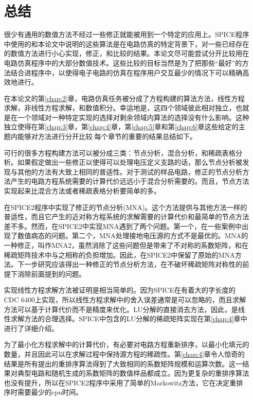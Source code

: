 \chapter{总结}
\label{chap:7}
很少有通用的数值方法不经过一些修正就能被用到一个特定的应用上。SPICE程序中使用的和本论文中说明的这些算法是在电路仿真的特定背景下，对一些已经存在的数值方法进行小心实现，修正，和比较的结果。本论文尽可能尝试分开比较用在电路仿真程序中的大部分数值技术。这些比较的目标当然是为了把那些“最好”的方法结合进程序中，以使得电子电路的仿真在程序用户交互最少的情况下可以精确高效地进行。

在本论文的第\ref{chap:2}章，电路仿真任务被分成了方程构建的算法方法，线性方程求解，非线性方程求解，和数值积分。幸运地是，这四个领域彼此相对独立，也就是在一个领域对一种特定实现的选择对剩余领域内算法的选择没有什么影响。这种独立使得在第\ref{chap:3}章，第\ref{chap:4}章，第\ref{chap:5}章和第\ref{chap:6}章这些给定的主题内能够对方法进行分开比较.每个章节的重要的结果总结如下。

可行的很多方程构建方法可以被分成三类：节点分析，混合分析，和稀疏表格分析。如果假定做出一些修正以使得可以处理电压定义支路的话，那么节点分析被发现与其他的方法有大致上相同的普适性。对于测试的样品电路，修正的节点分析方法产生的电路方程系统需要的计算代价远远小于混合分析需要的。而且，节点方法实现起来比混合方法或者稀疏表格分析要简单的多。

在SPICE2程序中实现了修正的节点分析(MNA)。这个方法提供与其他方法一样的普适性，而且它产生的近对称方程系统的求解需要的计算代价和最简单的节点方法差不多。然而，在SPICE2中实现MNA遇到了两个问题。第一个，在一些案例中出现了数值病态的问题。第二个，MNA处理接地电压源的方式不是最优的。MNA的一种修正，叫作MNA2，虽然消除了这些问题但是带来了不对称的系数矩阵，和在稀疏矩阵技术中与之相称的负担增加。因此，在SPICE2中保留了原始的MNA方法。下一步研究应该得出一种修正的节点分析方法，在不破坏稀疏矩阵对称性的前提下消除前面提到的问题。

实现线性方程求解方法被证明是相当简单的。因为SPICE在有着大的字长度的CDC 6400上实现，所以线性方程求解中的舍入误差通常是可以忽略的，而且求解方法可以基于计算代价而不是精度来优化。LU分解的直接消去方法，因此，是线性求解方法的合理选择。SPICE中包含的LU分解的稀疏矩阵实现在第\ref{chap:4}章中进行了详细介绍。

为了最小化方程求解中的计算代价，有必要对电路方程重新排序，以最小化填元的数量，并且因此可以在求解过程中保持源方程的稀疏性。第\ref{chap:4}章令人惊奇的结果是所有提出的重排序算法得到了大致相同的系数矩阵规模和运算次数。这一结果对典型电路和随机生成的系数矩阵的数值样品都成立。因为更复杂的重排序算法也没有提升，所以在SPICE2程序中采用了简单的Markowitz方法，它在决定重排序时需要最少的cpu时间。

